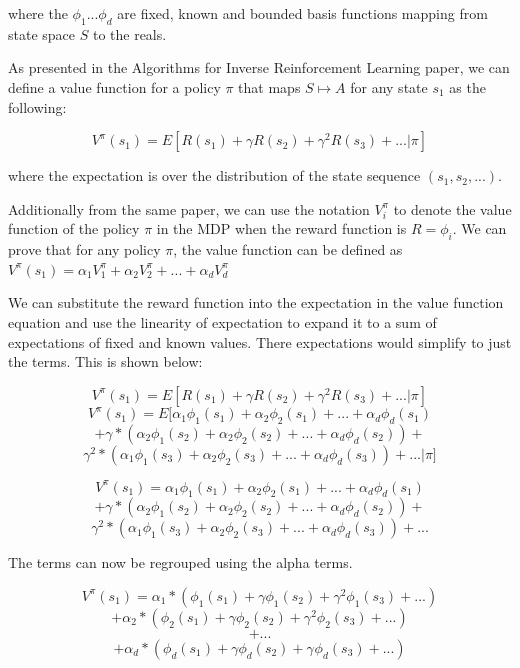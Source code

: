 \documentclass[11pt]{article}
\begin{document}
where the $\phi_{1} ... \phi_{d}$ are fixed, known and bounded basis functions mapping from state space $S$ to the reals. 

As presented in the Algorithms for Inverse Reinforcement Learning paper, we can define a value function for a policy $\pi$ that maps $S \mapsto A$  for any state $s_{1}$ as the following:

$$V^{\pi}(s_{1}) = E[R(s_{1}) + \gamma R(s_{2}) + \gamma^{2} R(s_{3}) + ... | \pi]$$

where the expectation is over the distribution of the state sequence $(s_{1}, s_{2}, ...)$.

Additionally from the same paper, we can use the notation $V_{i}^{\pi}$ to denote the value function of the policy $\pi$ in the MDP when the reward function is $R = \phi_{i}$. We can prove that for any policy $\pi$, the value function can be defined as $V^{\pi}(s_{1}) = \alpha_{1} V_{1}^{\pi} + \alpha_{2} V_{2}^{\pi} + ... + \alpha_{d} V_{d}^{\pi}$

We can substitute the reward function into the expectation in the value function equation and use the linearity of expectation to expand it to a sum of expectations of fixed and known values. There expectations would simplify to just the terms. This is shown below:

$$V^{\pi}(s_{1}) = E[R(s_{1}) + \gamma R(s_{2}) + \gamma^{2} R(s_{3}) + ... | \pi]$$
$$V^{\pi}(s_{1}) = E[\alpha_{1}\phi_{1}(s_{1}) + \alpha_{2}\phi_{2}(s_{1}) + ... +  \alpha_{d}\phi_{d}(s_{1})$$
$$ + \gamma * (\alpha_{2}\phi_{1}(s_{2}) + \alpha_{2}\phi_{2}(s_{2}) + ... +  \alpha_{d}\phi_{d}(s_{2})) +$$
$$ \gamma^{2}* (\alpha_{1}\phi_{1}(s_{3}) + \alpha_{2}\phi_{2}(s_{3}) + ... +  \alpha_{d}\phi_{d}(s_{3})) + ... | \pi]$$

$$V^{\pi}(s_{1}) = \alpha_{1}\phi_{1}(s_{1}) + \alpha_{2}\phi_{2}(s_{1}) + ... +  \alpha_{d}\phi_{d}(s_{1})$$
$$ + \gamma * (\alpha_{2}\phi_{1}(s_{2}) + \alpha_{2}\phi_{2}(s_{2}) + ... +  \alpha_{d}\phi_{d}(s_{2})) +$$
$$ \gamma^{2}* (\alpha_{1}\phi_{1}(s_{3}) + \alpha_{2}\phi_{2}(s_{3}) + ... +  \alpha_{d}\phi_{d}(s_{3})) + ... $$

The terms can now be regrouped using the alpha terms.

$$V^{\pi}(s_{1}) = \alpha_{1}*(\phi_{1}(s_{1}) + \gamma \phi_{1}(s_{2}) + \gamma^{2} \phi_{1}(s_{3}) + ... ) $$
$$
+ \alpha_{2}*(\phi_{2}(s_{1}) + \gamma \phi_{2}(s_{2}) + \gamma^{2} \phi_{2}(s_{3}) + ... )$$
$$
+ ... 
$$
$$
+ \alpha_{d}*(\phi_{d}(s_{1}) + \gamma \phi_{d}(s_{2}) + \gamma^{} \phi_{d}(s_{3}) + ... )
$$
\end{document}
